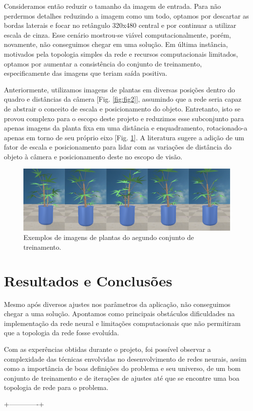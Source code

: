 \documentclass[twoside,conference,a4paper]{IEEEtran}
\begin{document}
Consideramos então reduzir o tamanho da imagem de entrada. Para não perdermos detalhes reduzindo a imagem como um todo, optamos por descartar as bordas laterais e focar no retângulo 320x480 central e por continuar a utilizar escala de cinza. Esse cenário mostrou-se viável computacionalmente, porém, novamente, não conseguimos chegar em uma solução. Em última instância, motivados pela topologia simples da rede e recursos computacionais limitados, optamos por aumentar a consistência do conjunto de treinamento, especificamente das imagens que teriam saída positiva.

Anteriormente, utilizamos imagens de plantas em diversas posições dentro do quadro e distâncias da câmera [Fig. \ref{fig:fig2}], assumindo que a rede seria capaz de abstrair o conceito de escala e posicionamento do objeto. Entretanto, isto se provou complexo para o escopo deste projeto e reduzimos esse subconjunto para apenas imagens da planta fixa em uma distância e enquadramento, rotacionado-a apenas em torno de seu próprio eixo [Fig. \ref{fig:fig3}]. A literatura sugere a adição de um fator de escala e posicionamento para lidar com as variações de distância do objeto à câmera e posicionamento deste no escopo de visão.

\begin{figure}[ht]
\centering
\includegraphics[width=1\hsize]{figuras/exemploconj2.png}
\caption{Exemplos de imagens de plantas do aegundo conjunto de treinamento.}
\label{fig:fig3}
\end{figure}

\section{Resultados e Conclusões}
Mesmo após diversos ajustes nos parâmetros da aplicação, não conseguimos chegar a uma solução. Apontamos como principais obstáculos dificuldades na implementação da rede neural e limitações computacionais que não permitiram que a topologia da rede fosse evoluída.

Com as experências obtidas durante o projeto, foi possível observar a complexidade das técnicas envolvidas no desenvolvimento de redes neurais, assim como a importância de boas definições do problema e seu universo, de um bom conjunto de treinamento e de iterações de ajustes até que se encontre uma boa topologia de rede para o problema.

 +-------------+




\end{document}
